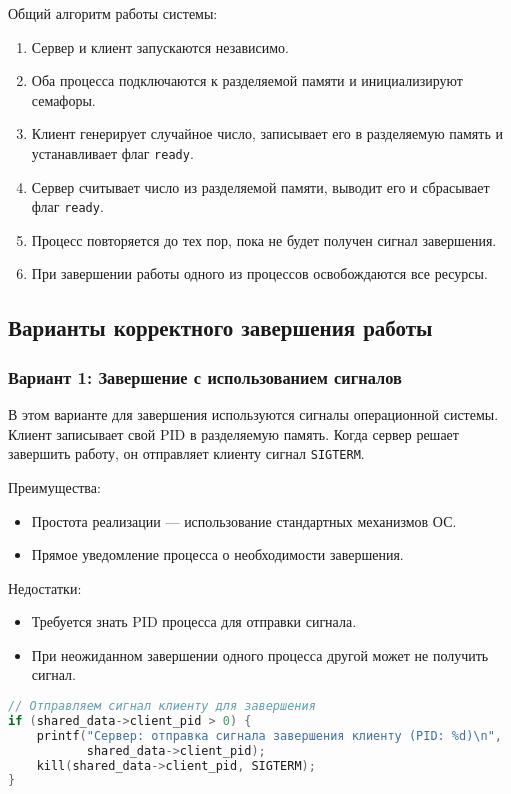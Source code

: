 \documentclass[a4paper,12pt]{article}
\begin{document}
Общий алгоритм работы системы:
\begin{enumerate}
    \item Сервер и клиент запускаются независимо.
    \item Оба процесса подключаются к разделяемой памяти и инициализируют семафоры.
    \item Клиент генерирует случайное число, записывает его в разделяемую память и устанавливает флаг \texttt{ready}.
    \item Сервер считывает число из разделяемой памяти, выводит его и сбрасывает флаг \texttt{ready}.
    \item Процесс повторяется до тех пор, пока не будет получен сигнал завершения.
    \item При завершении работы одного из процессов освобождаются все ресурсы.
\end{enumerate}

\subsection{Варианты корректного завершения работы}

\subsubsection{Вариант 1: Завершение с использованием сигналов}

В этом варианте для завершения используются сигналы операционной системы. Клиент записывает свой PID в разделяемую память. Когда сервер решает завершить работу, он отправляет клиенту сигнал \texttt{SIGTERM}.

Преимущества:
\begin{itemize}
    \item Простота реализации — использование стандартных механизмов ОС.
    \item Прямое уведомление процесса о необходимости завершения.
\end{itemize}

Недостатки:
\begin{itemize}
    \item Требуется знать PID процесса для отправки сигнала.
    \item При неожиданном завершении одного процесса другой может не получить сигнал.
\end{itemize}

\begin{lstlisting}[language=C, caption=Фрагмент кода сервера (отправка сигнала клиенту)]
// Отправляем сигнал клиенту для завершения
if (shared_data->client_pid > 0) {
    printf("Сервер: отправка сигнала завершения клиенту (PID: %d)\n", 
           shared_data->client_pid);
    kill(shared_data->client_pid, SIGTERM);
}
\end{lstlisting}
\end{document}
